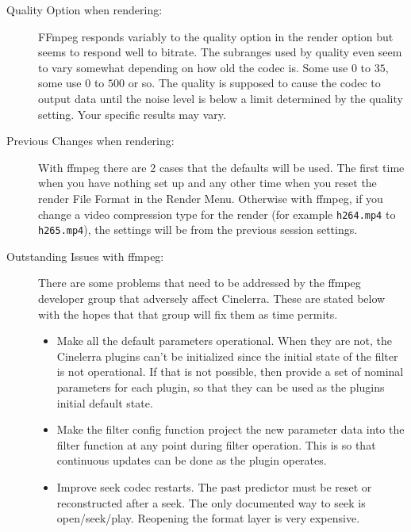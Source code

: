 \begin{description}
    \item[Quality Option when rendering:] FFmpeg responds variably to the quality option in the render option but seems to respond well to bitrate. The subranges used by quality even seem to vary somewhat depending on how old the codec is. Some use $0$ to $35$, some use $0$ to $500$ or so.  The quality is supposed to cause the codec to output data until the noise level is below a limit determined by the quality setting. Your specific results may vary.
    \item[Previous Changes when rendering:] With ffmpeg there are 2 cases that the defaults will be used.  The first time when you have nothing set up and any other time when you reset the render File Format in the Render Menu.  Otherwise with ffmpeg, if you change a video compression type for the render (for example \texttt{h264.mp4} to \texttt{h265.mp4}), the settings will be from the previous session settings.
    \item[Outstanding Issues with ffmpeg:] There are some problems that need to be addressed by the ffmpeg developer group that adversely affect Cinelerra.  These are stated below with the hopes that that group will fix them as time permits.
    \begin{itemize}
        \item Make all the default parameters operational.  When they are not, the Cinelerra plugins can't be initialized since the initial state of the filter is not operational.  If that is not possible, then provide a set of nominal parameters for each plugin, so that they can be used as the plugins initial default state.
        \item Make the filter config function project the new parameter data into the filter function at any point
        during filter operation.  This is so that continuous updates can be done as the plugin operates.
        \item Improve seek codec restarts.  The past predictor must be reset or reconstructed after a seek.  The  only documented way to seek is open/seek/play.  Reopening the format layer is very expensive.
    \end{itemize}
\end{description}
